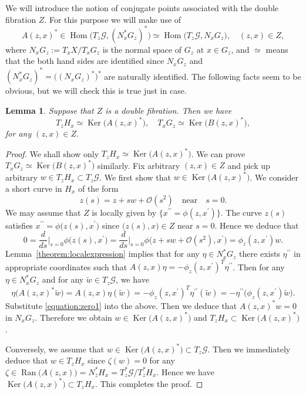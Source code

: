 \documentclass[a4paper,11pt,reqno]{amsart}
\newtheorem{lemma}[theorem]{Lemma}
\theoremstyle{definition}
\theoremstyle{remark}
\begin{document}
%
%
We will introduce the notion of conjugate points associated with the double fibration $Z$. 
For this purpose we will make use of 
%
%
$$
A(z,x)^\ast 
\in 
\operatorname{Hom}\bigl(T_z\mathcal{G},(N^\ast_xG_z)^\ast\bigr)
\simeq
\operatorname{Hom}\bigl(T_z\mathcal{G},N_xG_z\bigr), 
\quad
(z,x) \in Z, 
$$ 
%
%
where $N_xG_z:=T_xX/T_xG_z$ is the normal space of $G_z$ at $x \in G_z$, and $\simeq$ means that the both hand sides are identified since $N_xG_z$ and $(N^\ast_xG_z)^\ast=\bigl((N_xG_z)^\ast\bigr)^\ast$ are naturally identified. 
The following facts seem to be obvious, 
but we will check this is true just in case. 
%
%
\begin{lemma}
\label{theorem:Aast}
Suppose that $Z$ is a double fibration. Then we have 
%
%
$$
T_zH_x
\simeq
\operatorname{Ker}\bigl(A(z,x)^\ast\bigr),
\quad
T_xG_z
\simeq
\operatorname{Ker}\bigl(B(z,x)^\ast\bigr),
$$
%
%
for any $(z,x) \in Z$. 
\end{lemma}
%
%
\begin{proof}
We shall show only $T_zH_x\simeq\operatorname{Ker}\bigl(A(z,x)^\ast\bigr)$. 
We can prove $T_xG_z\simeq\operatorname{Ker}\bigl(B(z,x)^\ast\bigr)$ similarly. 
Fix arbitrary $(z,x) \in Z$ and pick up arbitrary $w \in T_zH_x \subset T_z\mathcal{G}$. 
We first show that $w \in \operatorname{Ker}\bigl(A(z,x)^\ast\bigr)$. 
We consider a short curve in $H_x$ of the form 
%
%
$$
z(s)=z+sw+\mathcal{O}(s^2)
\quad\text{near}\quad
s=0.
$$
%
%
We may assume that $Z$ is locally given by $\{x^{\prime\prime}=\phi(z,x^\prime)\}$. 
The curve $z(s)$ satisfies $x^{\prime\prime}=\phi\bigl(z(s),x^\prime\bigr)$ 
since $\bigl(z(s),x\bigr) \in Z$ near $s=0$. Hence we deduce that 
%
%
\begin{equation}
0
=
\frac{d}{ds}\bigg\vert_{s=0}
\phi\bigl(z(s),x^\prime\bigr)
=
\frac{d}{ds}\bigg\vert_{s=0}
\phi\bigl(z+sw+\mathcal{O}(s^2),x^\prime\bigr)
=
\phi_z(z,x^\prime)w.
\label{equation:zero1} 
\end{equation}
%
%  
Lemma~\ref{theorem:localexpression} implies that for any $\eta \in N^\ast_xG_z$ 
there exists $\eta^{\prime\prime}$ in appropriate coordinates such that 
$A(z,x)\eta=-\phi_z(z,x^\prime)^T\eta^{\prime\prime}$. 
Then for any $\eta \in N^\ast_xG_z$ and for any $\tilde{w} \in T_z\mathcal{G}$, 
we have 
%
%
$$
\eta\bigl(A(z,x)^\ast\tilde{w}\bigr)
=
A(z,x)\eta(\tilde{w})
=
-\phi_z(z,x^\prime)^T\eta^{\prime\prime}(\tilde{w})
=
-\eta^{\prime\prime}\bigl(\phi_z(z,x^\prime)\tilde{w}\bigr). 
$$
%
%
Substitute \eqref{equation:zero1} into the above. 
Then we deduce that $A(z,x)^\ast{w}=0$ in $N_xG_z$. 
Therefore we obtain $w \in \operatorname{Ker}\bigl(A(z,x)^\ast\bigr)$ and 
$T_zH_x \subset \operatorname{Ker}\bigl(A(z,x)^\ast\bigr)$. 
%
%
\par
%
%
Conversely, we assume that $w \in \operatorname{Ker}\bigl(A(z,x)^\ast\bigr) \subset T_z\mathcal{G}$. 
Then we immediately deduce that $w \in T_zH_x$ since 
$\zeta(w)=0$ for any $\zeta \in \operatorname{Ran}\bigl(A(z,x)\bigr)=N^\ast_zH_x=T^\ast_z\mathcal{G}/T^\ast_z{H_x}$. 
Hence we have $\operatorname{Ker}\bigl(A(z,x)^\ast\bigr) \subset T_zH_x$. 
This completes the proof. 
\end{proof}
\end{document}

